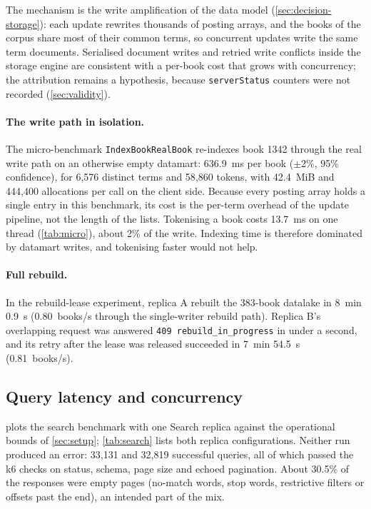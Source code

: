 \documentclass[10pt,a4paper]{article}
\newcommand{\code}[1]{\texttt{#1}}
\begin{document}
The mechanism is the write amplification of the data model
(\cref{sec:decision-storage}): each update rewrites thousands of posting
arrays, and the books of the corpus share most of their common terms, so
concurrent updates write the same term documents. Serialised document writes
and retried write conflicts inside the storage engine are consistent with a
per-book cost that grows with concurrency; the attribution remains a
hypothesis, because \code{serverStatus} counters were not recorded
(\cref{sec:validity}).

\paragraph{The write path in isolation.}
The micro-benchmark \code{IndexBookRealBook} re-indexes book 1342 through the
real write path on an otherwise empty datamart: 636.9~ms per book ($\pm$2\%,
95\% confidence), for 6{,}576 distinct terms and 58{,}860 tokens, with 42.4~MiB
and 444{,}400 allocations per call on the client side. Because every posting
array holds a single entry in this benchmark, its cost is the per-term overhead
of the update pipeline, not the length of the lists. Tokenising a book costs
13.7~ms on one thread (\cref{tab:micro}), about 2\% of the write. Indexing time
is therefore dominated by datamart writes, and tokenising faster would not
help.

\paragraph{Full rebuild.}
In the rebuild-lease experiment, replica A rebuilt the 383-book datalake in
8~min 0.9~s (0.80~books/s through the single-writer rebuild path). Replica B's
overlapping request was answered \code{409 rebuild\_in\_progress} in under a
second, and its retry after the lease was released succeeded in 7~min 54.5~s
(0.81~books/s).

\subsection{Query latency and concurrency}
\label{sec:bench-search}

 plots the search benchmark with one Search replica against the
operational bounds of \cref{sec:setup}; \cref{tab:search} lists both replica
configurations. Neither run produced an error: 33{,}131 and 32{,}819
successful queries, all of which passed the k6 checks on status, schema, page
size and echoed pagination. About 30.5\% of the responses were empty pages
(no-match words, stop words, restrictive filters or offsets past the end), an
intended part of the mix.
\end{document}
